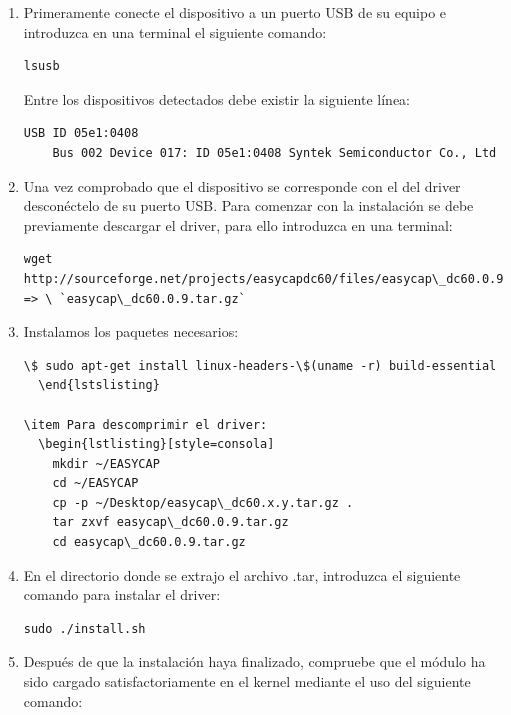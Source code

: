 \begin{enumerate}
\item Primeramente conecte el dispositivo a un puerto USB de su equipo e introduzca en una terminal el siguiente comando:
  \begin{lstlisting}[style=consola]
    lsusb
  \end{lstlisting}
  
  Entre los dispositivos detectados debe existir la siguiente línea:
  
  \begin{lstlisting}[style=consola]
    USB ID 05e1:0408
    Bus 002 Device 017: ID 05e1:0408 Syntek Semiconductor Co., Ltd
  \end{lstlisting}
  
\item Una vez comprobado que el dispositivo se corresponde con el del driver desconéctelo de su puerto USB. Para comenzar con la instalación se debe previamente descargar el driver, para ello introduzca en una terminal:
  
  \begin{lstlisting}[style=consola]
    wget http://sourceforge.net/projects/easycapdc60/files/easycap\_dc60.0.9.tar.gz/download => \ `easycap\_dc60.0.9.tar.gz`
  \end{lstlisting}
  
\item Instalamos los paquetes necesarios:
  \begin{lstlisting}[style=consola]
    \$ sudo apt-get install linux-headers-\$(uname -r) build-essential
  \end{lstslisting}
  
\item Para descomprimir el driver:
  \begin{lstlisting}[style=consola]
    mkdir ~/EASYCAP
    cd ~/EASYCAP
    cp -p ~/Desktop/easycap\_dc60.x.y.tar.gz .
    tar zxvf easycap\_dc60.0.9.tar.gz  
    cd easycap\_dc60.0.9.tar.gz
  \end{lstlisting}
  
\item En el directorio donde se extrajo el archivo .tar, introduzca el siguiente comando para instalar el driver:
  
  \begin{lstlisting}[style=consola]
    sudo ./install.sh
  \end{lstlisting}
  
\item Después de que la instalación haya finalizado, compruebe que el módulo ha sido cargado satisfactoriamente en el kernel mediante el uso del siguiente comando:
  

\end{enumerate}
